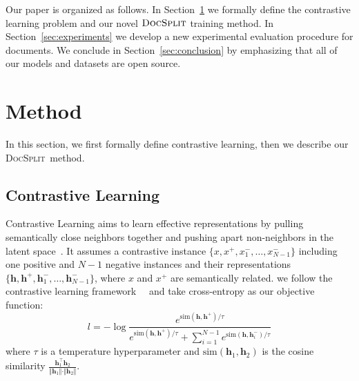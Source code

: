 \documentclass[11pt]{article}
\newcommand{\our}{\mbox{\textsc{DocSplit}}}
\begin{document}

Our paper is organized as follows.
In Section~\ref{sec:method} we formally define the contrastive learning problem and our novel $\our$ training method.
In Section~\ref{sec:experiments} we develop a new experimental evaluation procedure for documents.
We conclude in Section~\ref{sec:conclusion} by emphasizing that all of our models and datasets are open source.

\section{Method}

\label{sec:method}
In this section, we first formally define contrastive learning, then we describe our \our~method.

%
%

\subsection{Contrastive Learning}
Contrastive Learning aims to learn effective representations by pulling semantically close neighbors together and pushing apart non-neighbors in the latent space~\cite{Hadsell2006DimensionalityRB}.
It assumes a contrastive instance $\{x, x^{+}, x_1^{-},\dots,x_{N-1}^{-}\}$ including one positive and $N-1$ negative instances and their representations $\{\mathbf{h}, \mathbf{h}^{+}, \mathbf{h}_1^{-}, \dots,
\mathbf{h}_{N-1}^{-}\}$, where $x$ and $x^{+}$ are semantically related.
we follow the contrastive learning framework~~\cite{Chen2020ASF, Li2022UCTopicUC} and take cross-entropy as our objective function:
\begin{equation}
\label{cl}
    l = -\log \frac{e^{\mathrm{sim}(\mathbf{h}, \mathbf{h}^{+})/\tau}}{e^{\mathrm{sim}(\mathbf{h}, \mathbf{h}^{+})/\tau}+ \sum_{i=1}^{N-1}e^{\mathrm{sim}(\mathbf{h}, \mathbf{h}_i^{-})/\tau}}
\end{equation}
where $\tau$ is a temperature hyperparameter and $\mathrm{sim}(\mathbf{h}_1, \mathbf{h}_2)$ is the cosine similarity $\frac{\mathbf{h}_1^{\top}\mathbf{h}_2}{\Vert \mathbf{h}_1 \Vert \cdot \Vert \mathbf{h}_2 \Vert}$.
\end{document}
